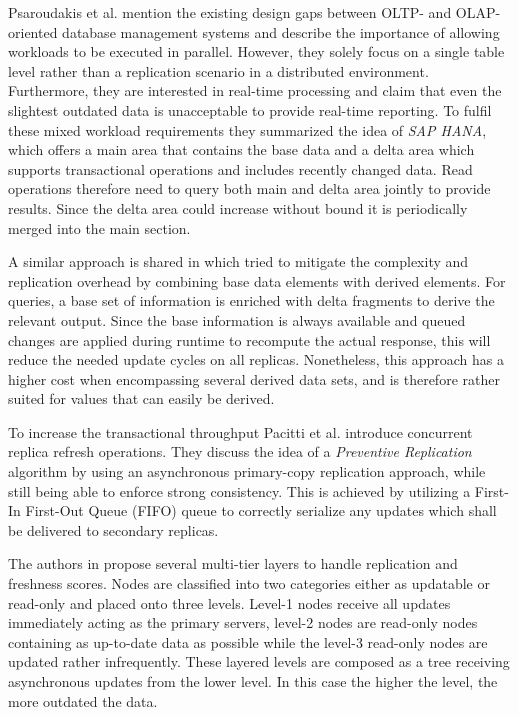 Psaroudakis et al. \cite{psaroudakis:2015} mention the existing design gaps between OLTP- and OLAP-oriented database management systems and describe the importance of 
allowing workloads to be executed in parallel. However, they solely focus on a single table level rather than a replication scenario in a distributed 
environment. Furthermore, they are interested in real-time processing and claim that even the slightest outdated data is unacceptable to provide real-time reporting.
To fulfil these mixed workload requirements they summarized the idea of \emph{SAP HANA}, which offers a main area that contains the base data and a delta area 
which supports transactional operations and includes recently changed data. Read operations therefore need to query both main and delta area jointly to provide results. 
Since the delta area could increase without bound it is periodically merged into the main section. 


A similar approach is shared in \cite{wei:2004} which tried to mitigate the complexity and replication overhead by combining base data elements with derived elements.
For queries, a base set of information is enriched with delta fragments to derive the relevant output.
Since the base information is always available and queued changes are applied during runtime to recompute 
the actual response, this will reduce the needed update cycles on all replicas. Nonetheless, this approach has a higher cost when encompassing several derived data sets, and 
is therefore rather suited for values that can easily be derived.


To increase the transactional throughput Pacitti et al. \cite{pacitti:2005} introduce concurrent replica refresh operations.
They discuss the idea of a \emph{Preventive Replication} algorithm by using an asynchronous primary-copy replication approach, while still being able to enforce
strong consistency. This is achieved by utilizing a First-In First-Out Queue (FIFO) queue to correctly serialize any updates which shall be delivered to secondary replicas.

The authors in \cite{voicu:2010} propose several multi-tier layers to handle replication and freshness scores. 
Nodes are classified into two categories either as updatable or read-only and placed onto three levels.
Level-1 nodes receive all updates immediately acting as the primary servers, level-2 nodes are read-only nodes containing as up-to-date data as possible while the
level-3 read-only nodes are updated rather infrequently. These layered levels are composed as a tree receiving asynchronous updates from the lower level. 
In this case the higher the level, the more outdated the data.

